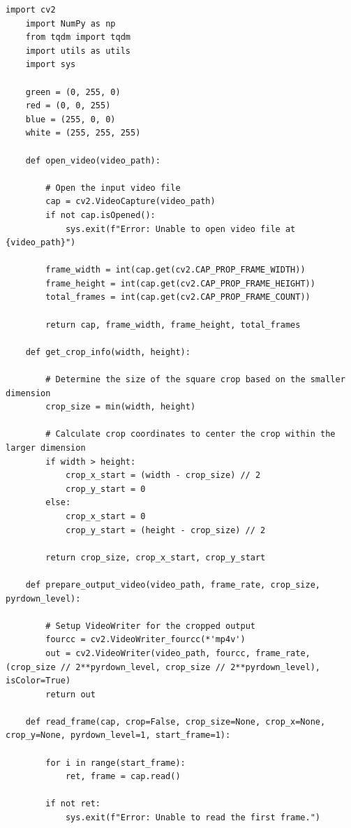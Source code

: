 \documentclass[11pt, conference, letterpaper]{IEEEtran}
\begin{document}
\begin{lstlisting}[style=python, caption={\texttt{video\_utils.py}}, label={lst:vutils}]
    import cv2
    import NumPy as np
    from tqdm import tqdm
    import utils as utils
    import sys
    
    green = (0, 255, 0)
    red = (0, 0, 255)
    blue = (255, 0, 0)
    white = (255, 255, 255)
    
    def open_video(video_path):
        
        # Open the input video file
        cap = cv2.VideoCapture(video_path)
        if not cap.isOpened():
            sys.exit(f"Error: Unable to open video file at {video_path}")
    
        frame_width = int(cap.get(cv2.CAP_PROP_FRAME_WIDTH))
        frame_height = int(cap.get(cv2.CAP_PROP_FRAME_HEIGHT))
        total_frames = int(cap.get(cv2.CAP_PROP_FRAME_COUNT))
        
        return cap, frame_width, frame_height, total_frames
    
    def get_crop_info(width, height):
        
        # Determine the size of the square crop based on the smaller dimension
        crop_size = min(width, height)
        
        # Calculate crop coordinates to center the crop within the larger dimension
        if width > height:
            crop_x_start = (width - crop_size) // 2
            crop_y_start = 0
        else:
            crop_x_start = 0
            crop_y_start = (height - crop_size) // 2
            
        return crop_size, crop_x_start, crop_y_start
    
    def prepare_output_video(video_path, frame_rate, crop_size, pyrdown_level):
        
        # Setup VideoWriter for the cropped output
        fourcc = cv2.VideoWriter_fourcc(*'mp4v')
        out = cv2.VideoWriter(video_path, fourcc, frame_rate, (crop_size // 2**pyrdown_level, crop_size // 2**pyrdown_level), isColor=True)
        return out
    
    def read_frame(cap, crop=False, crop_size=None, crop_x=None, crop_y=None, pyrdown_level=1, start_frame=1):
        
        for i in range(start_frame):
            ret, frame = cap.read()
        
        if not ret:
            sys.exit(f"Error: Unable to read the first frame.")
        

\end{lstlisting}
\end{document}
